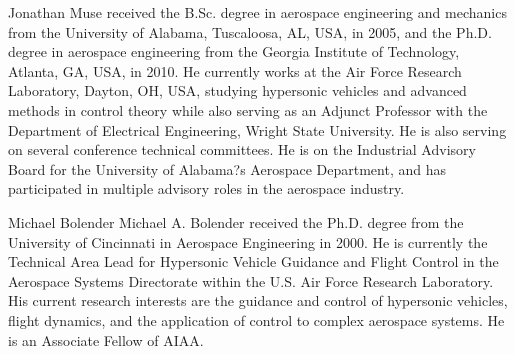 \documentclass[journal]{IEEEtran}
\newcommand{\figurepath}{../fig/bio}
\begin{document}
\begin{multicols}{2}
    \begin{IEEEbiography}{Jonathan Muse}
      received the B.Sc. degree in aerospace engineering and mechanics from the University of Alabama, Tuscaloosa, AL, USA, in 2005, and the Ph.D. degree in aerospace engineering from the Georgia Institute of Technology, Atlanta, GA, USA, in 2010.
      He currently works at the Air Force Research Laboratory, Dayton, OH, USA, studying hypersonic vehicles and advanced methods in control theory while also serving as an Adjunct Professor with the Department of Electrical Engineering, Wright State University.
      He is also serving on several conference technical committees.
      He is on the Industrial Advisory Board for the University of Alabama?s Aerospace Department, and has participated in multiple advisory roles in the aerospace industry.
    \end{IEEEbiography}

    \begin{IEEEbiography}{Michael Bolender}
      Michael A. Bolender received the Ph.D. degree from the University of Cincinnati in Aerospace Engineering in 2000.
      He is currently the Technical Area Lead for Hypersonic Vehicle Guidance and Flight Control in the Aerospace Systems Directorate within the U.S. Air Force Research Laboratory.
      His current research interests are the guidance and control of hypersonic vehicles, flight dynamics, and the application of control to complex aerospace systems.
      He is an Associate Fellow of AIAA.
    \end{IEEEbiography}


\end{multicols}
\end{document}
